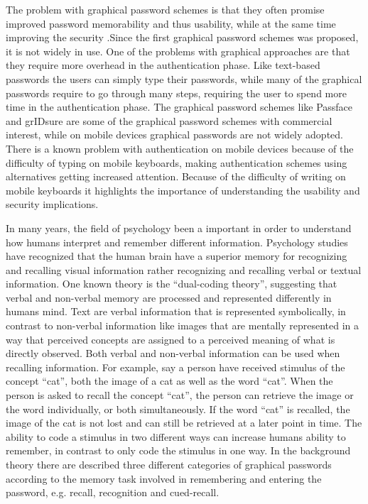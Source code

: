     The problem with graphical password schemes is that they often promise improved password memorability and thus usability, while at the same time improving the security \cite{Biddle}.Since the first graphical password schemes was proposed, it is not widely in use. One of the problems with graphical approaches are that they require more overhead in the authentication phase. Like text-based passwords the users can simply type their passwords, while many of the graphical passwords require to go through many steps, requiring the user to spend more time in the authentication phase. The graphical password schemes like Passface and grIDsure are some of the graphical password schemes with commercial interest, while on mobile devices graphical passwords are not widely adopted. There is a known problem with authentication on mobile devices because of the difficulty of typing on mobile keyboards, making authentication schemes using alternatives getting increased attention. Because of the difficulty of writing on mobile keyboards it highlights the importance of understanding the usability and security implications.

    In many years, the field of psychology been a important in order to understand how humans interpret and remember different information. Psychology studies have recognized that the human brain have a superior memory for recognizing and recalling visual information rather recognizing and recalling verbal or textual information. One known theory is the ``dual-coding theory'', suggesting that verbal and non-verbal memory are processed and represented differently in humans mind. Text are verbal information that is represented symbolically, in contrast to non-verbal information like images that are mentally represented in a way that perceived concepts are assigned to a perceived meaning of what is directly observed. Both verbal and non-verbal information can be used when recalling information. For example, say a person have received stimulus of the concept ``cat'', both the image of a cat as well as the word ``cat''. When the person is asked to recall the concept ``cat'', the person can retrieve the image or the word individually, or both simultaneously. 
    If the word ``cat'' is recalled, the image of the cat is not lost and can still be retrieved at a later point in time. The ability to code a stimulus in two different ways can increase humans ability to remember, in contrast to only code the stimulus in one way.
    In the background theory there are described three different categories of graphical passwords according to the memory task involved in remembering and entering the password, e.g. recall, recognition and cued-recall. 


